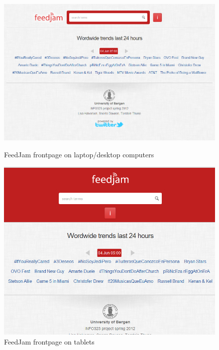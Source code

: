 \begin{figure}[ht]
    \begin{minipage}[b]{0.5\linewidth}
        \centering
        \includegraphics[width=\textwidth]{figures/feedjam_final_frontpage}
        \caption{FeedJam frontpage on laptop/desktop computers}
        \label{fig:FeedJamFrontpage}
    \end{minipage}
    \hspace{0.5cm}
    \begin{minipage}[b]{0.5\linewidth}
        \centering
        \includegraphics[width=\textwidth]{figures/feedjam_responsive_frontpage}
        \caption{FeedJam frontpage on tablets}
        \label{fig:FeedJamFrontpageTablet}
    \end{minipage}
\end{figure}

